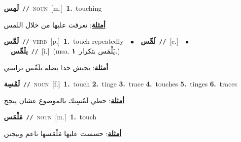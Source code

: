 \documentclass[10pt,a4paper,twoside]{article} %
\begin{document}
\begin{multicols}{2}
{\setlength\topsep{0pt}\textbf{\foreignlanguage{arabic}{لَمِس}}\ {\color{gray}\texttt{//}\color{black}}\ \textsc{noun}\ [m.]\ \textbf{1.}~touching\  \begin{flushright}\color{gray}\foreignlanguage{arabic}{\textbf{\underline{\foreignlanguage{arabic}{أمثلة}}}: تعرفت عليها من خلال اللمس}\end{flushright}\color{black}} \vspace{2mm}

{\setlength\topsep{0pt}\textbf{\foreignlanguage{arabic}{لَمَّس}}\ {\color{gray}\texttt{//}\color{black}}\ \textsc{verb}\ [p.]\ \textbf{1.}~touch repeatedly\ \ $\bullet$\ \ \setlength\topsep{0pt}\textbf{\foreignlanguage{arabic}{لَمِّس}}\ {\color{gray}\texttt{//}\color{black}}\ [c.]\ \ $\bullet$\ \ \setlength\topsep{0pt}\textbf{\foreignlanguage{arabic}{يلَمِّس}}\ {\color{gray}\texttt{//}\color{black}}\ [i.]\ \color{gray}(msa. \foreignlanguage{arabic}{يَلْمَس بتكرار}~\foreignlanguage{arabic}{\textbf{١.}})\color{black}\  \begin{flushright}\color{gray}\foreignlanguage{arabic}{\textbf{\underline{\foreignlanguage{arabic}{أمثلة}}}: بحبش حدا يضله يلَمِّس براسي}\end{flushright}\color{black}} \vspace{2mm}

{\setlength\topsep{0pt}\textbf{\foreignlanguage{arabic}{لَمْسِة}}\ {\color{gray}\texttt{//}\color{black}}\ \textsc{noun}\ [f.]\ \textbf{1.}~touch  \textbf{2.}~tinge  \textbf{3.}~trace  \textbf{4.}~touches  \textbf{5.}~tinges  \textbf{6.}~traces\  \begin{flushright}\color{gray}\foreignlanguage{arabic}{\textbf{\underline{\foreignlanguage{arabic}{أمثلة}}}: حطي لَمْسِتك بالموضوع عشان ينجح}\end{flushright}\color{black}} \vspace{2mm}

{\setlength\topsep{0pt}\textbf{\foreignlanguage{arabic}{مَلْمَس}}\ {\color{gray}\texttt{//}\color{black}}\ \textsc{noun}\ [m.]\ \textbf{1.}~touch\  \begin{flushright}\color{gray}\foreignlanguage{arabic}{\textbf{\underline{\foreignlanguage{arabic}{أمثلة}}}: حسست عليها مَلْمَسها ناعم وبيجنن}\end{flushright}\color{black}} \vspace{2mm}


\end{multicols}
\end{document}
